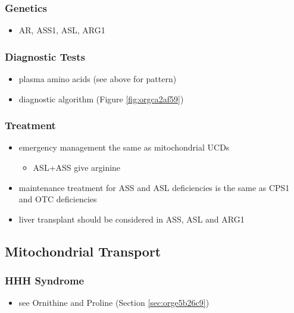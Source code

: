 \documentclass{scrartcl}
\begin{document}
\subsubsection{Genetics}
\label{sec:orgde37712}
\begin{itemize}
\item AR, ASS1, ASL, ARG1
\end{itemize}

\subsubsection{Diagnostic Tests}
\label{sec:orgeb53f24}
\begin{itemize}
\item plasma amino acids (see above for pattern)
\item diagnostic algorithm (Figure \ref{fig:orgca2af59})
\end{itemize}

\subsubsection{Treatment}
\label{sec:org4156956}
\begin{itemize}
\item emergency management the same as mitochondrial UCDs
\begin{itemize}
\item ASL+ASS give arginine
\end{itemize}
\item maintenance treatment for ASS and ASL deficiencies is the same as
CPS1 and OTC deficiencies
\item liver transplant should be considered in ASS, ASL and ARG1
\end{itemize}

\subsection{Mitochondrial Transport}
\label{sec:orgd002ba4}
\subsubsection{HHH Syndrome}
\label{sec:orgc7e7fce}
\begin{itemize}
\item see Ornithine and Proline (Section \ref{sec:orge5b26c9})
\end{itemize}
\end{document}
